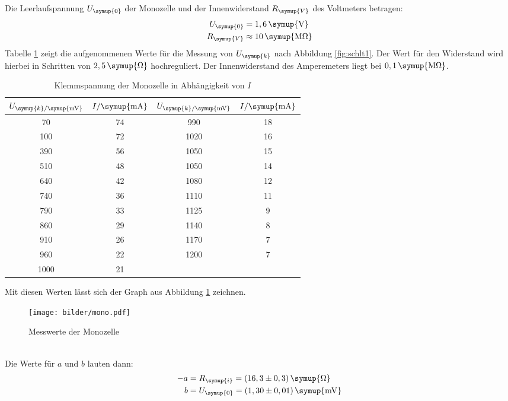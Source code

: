 Die Leerlaufspannung $U_\symup{0}$ der Monozelle und der Innenwiderstand
$R_\symup{V}$ des Voltmeters betragen:
\begin{align*}
  U_\symup{0} &= 1,6 \,\symup{\si{\volt}} \\
  R_\symup{V} &\approx 10\,\symup{\si{\mega\ohm}}
\end{align*}
Tabelle \ref{tab:U_k} zeigt die aufgenommenen Werte für die Messung von
$U_\symup{k}$ nach Abbildung \ref{fig:schlt1}. Der Wert für den Widerstand wird
hierbei in Schritten von $2,5\,\symup{\si\ohm}$ hochreguliert. Der Innenwiderstand
des Amperemeters liegt bei $0,1\,\symup{\si{\mega\ohm}}$.
\begin{table}[H]
  \centering
  \begin{tabular}{c c c c}
    \toprule
    $U_{\symup{k}/\symup{\si{\milli\volt}}}$ & $I/\symup{\si{\milli\ampere}}$  &
    $U_{\symup{k}/\symup{\si{\milli\volt}}}$ & $I/\symup{\si{\milli\ampere}}$  \\
    \midrule
      70  &  74  &   990  &  18  \\
     100  &  72  &  1020  &  16  \\
     390  &  56  &  1050  &  15  \\
     510  &  48  &  1050  &  14  \\
     640  &  42  &  1080  &  12  \\
     740  &  36  &  1110  &  11  \\
     790  &  33  &  1125  &   9  \\
     860  &  29  &  1140  &   8  \\
     910  &  26  &  1170  &   7  \\
     960  &  22  &  1200  &   7  \\
    1000  &  21  &  \hrulefill  & \hrulefill  \\
    \bottomrule
  \end{tabular}
  \caption{Klemmspannung der Monozelle in Abhängigkeit von $I$}
  \label{tab:U_k}
\end{table}
Mit diesen Werten lässt sich der Graph aus Abbildung \ref{fig:mono} zeichnen.
\begin{figure}[h]
  \centering
  \texttt{[image: bilder/mono.pdf]}
  \caption{Messwerte der Monozelle}
  \label{fig:mono}
\end{figure}
\\
Die Werte für $a$ und $b$ lauten dann:
\begin{align*}
  -a &= R_\symup{i} = (16,3 \pm 0,3)\, \symup{\si{\ohm}} \\
   b &= U_\symup{0} = (1,30 \pm 0,01)\, \symup{\si{\milli\volt}}
\end{align*}
